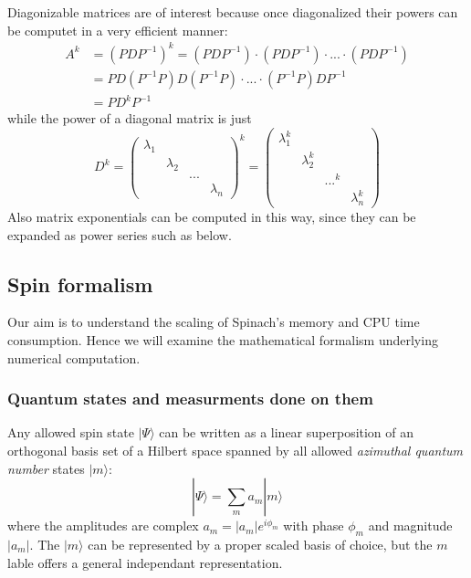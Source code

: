 \documentclass[11.5pt,a4paper]{article}
\begin{document}
Diagonizable matrices are of interest because once diagonalized their powers can be computet in a very efficient manner:
\begin{align*}
 A^k & = (P D P^{-1})^k = ( P D P^{-1}) \cdot ( P D P^{-1}) \cdot ... \cdot (P D P^{-1}) \\
    & = P D (P^{-1} P) D (P^{-1} P) \cdot ... \cdot (P^{-1} P) D P^{-1} \\
    & = P D^k P^{-1}
\end{align*}
while the power of a diagonal matrix is just
\begin{equation}
 D^k = \begin{pmatrix} 
		\lambda_1 & & & \\
		& \lambda_2 & & \\
		& & \text{...} & \\
		& & & \lambda_n
              \end{pmatrix}^k = 
	\begin{pmatrix} 
		\lambda_1^k & & & \\
		& \lambda_2^k & & \\
		& & \text{...}^k & \\
		& & & \lambda_n^k
              \end{pmatrix}
\end{equation}
Also matrix exponentials can be computed in this way, since they can be expanded as power series such as below.



\subsection{Spin formalism}
Our aim is to understand the scaling of Spinach's memory and CPU time consumption. Hence we will examine the mathematical formalism underlying numerical computation.
\subsubsection{Quantum states and measurments done on them}
Any allowed spin state $| \Psi \rangle$ can be written as a linear superposition of an orthogonal basis set of a Hilbert  space spanned by all allowed \emph{azimuthal quantum number} states $| m \rangle$:
\begin{equation}
 | \Psi \rangle = \sum_m a_m | m \rangle 
\label{eq-orthonormal-basis}
\end{equation}
where the amplitudes are complex $a_m = |a_m| e^{i\phi_m}$ with phase $\phi_m$ and magnitude $|a_m|$. The $|m\rangle$ can be represented by a proper scaled basis of choice, but the $m$ lable offers a general independant representation.
 
\end{document}
